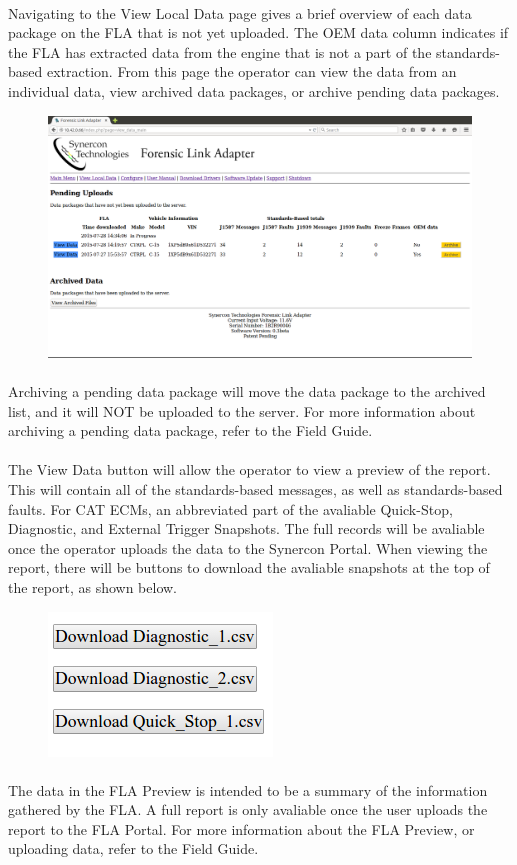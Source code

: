 \documentclass[11pt]{article}
\begin{document}
\paragraph{  }
Navigating to the View Local Data page gives a brief overview of each data package on the FLA that is not yet uploaded. The OEM data column indicates if the FLA has extracted data from the engine that is not a part of the standards-based extraction. From this page the operator can view the data from an individual data, view archived data packages, or archive pending data packages.
\begin{figure}[tbph]
\centering
\includegraphics[width=.95\linewidth]{../../media/fla_preview_screenshots/local_data}
\label{fig:fla_preview_local_data}
\end{figure}
\paragraph{  }
Archiving a pending data package will move the data package to the archived list, and it will NOT be uploaded to the server. For more information about archiving a pending data package, refer to the Field Guide.
\paragraph{  }
The View Data button will allow the operator to view a preview of the report. This will contain all of the standards-based messages, as well as standards-based faults. For CAT ECMs, an abbreviated part of the avaliable Quick-Stop, Diagnostic, and External Trigger Snapshots. The full records will be avaliable once the operator uploads the data to the Synercon Portal. When viewing the report, there will be buttons to download the avaliable snapshots at the top of the report, as shown below.
\begin{figure}[tbph]
\centering
\includegraphics[width=.3\linewidth]{../../media/fla_preview_screenshots/csv_download}
\end{figure}

\paragraph{  }
The data in the FLA Preview is intended to be a summary of the information gathered by the FLA. A full report is only avaliable once the user uploads the report to the FLA Portal. For more information about the FLA Preview, or uploading data, refer to the Field Guide.
\end{document}

